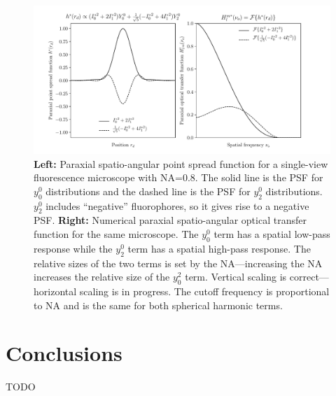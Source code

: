 \documentclass[11pt]{article}
\begin{document}
\begin{figure}[h]
 \captionsetup{width=1.0\linewidth}
 \centering
   \centering
   \includegraphics[width = 1.\textwidth]{../calculations/ft.pdf}
   \caption{\textbf{Left:} Paraxial spatio-angular point spread function for a
     single-view fluorescence microscope with NA=0.8. The solid line is the PSF
     for $y_0^0$ distributions and the dashed line is the PSF for $y_2^0$
     distributions. $y_2^0$ includes ``negative'' fluorophores, so it gives rise
     to a negative PSF. \textbf{Right:} Numerical paraxial spatio-angular
     optical transfer function for the same microscope. The $y_0^0$ term has a
     spatial low-pass response while the $y_2^0$ term has a spatial high-pass
     response. The relative sizes of the two terms is set by the NA---increasing
     the NA increases the relative size of the $y_0^2$ term. Vertical scaling is
     correct---horizontal scaling is in progress. The cutoff frequency is
     proportional to NA and is the same for both spherical harmonic terms.}
   \label{fig:para}
\end{figure}
    
\section{Conclusions}

TODO 

{}


\appendix
\end{document}
